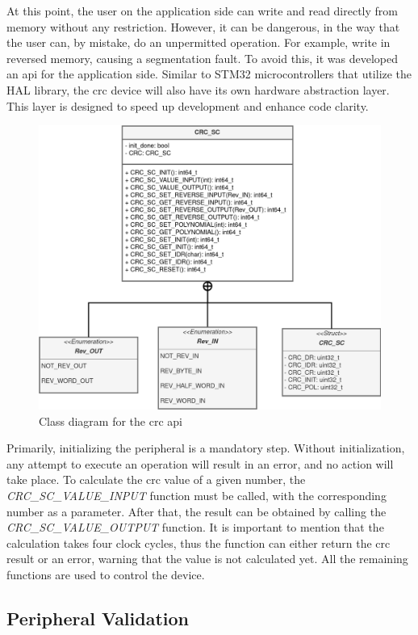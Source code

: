 At this point, the user on the application side can write and read directly from memory without any restriction. However, it can be
dangerous, in the way that the user can, by mistake, do an unpermitted operation. For example, write in reversed memory, causing a
segmentation fault. To avoid this, it was developed an \gls{api} for the application side. Similar to STM32 microcontrollers that 
utilize the HAL library, the \gls{crc} device will also have its own hardware abstraction layer. This layer is designed to speed up 
development and enhance code clarity.

\begin{figure}[H]
	\centering
 	\includegraphics[width=0.7\linewidth]{Images/CRC_API_Class_Diagram.png} 
 	\caption{Class diagram for the \gls{crc} \gls{api}}
\end{figure}

Primarily, initializing the peripheral is a mandatory step. Without initialization, any attempt to execute an operation will 
result in an error, and no action will take place. To calculate the \gls{crc} value of a given number, the \textit{CRC\_SC\_VALUE\_INPUT} 
function must be called, with the corresponding number as a parameter. After that, the result can be obtained by calling the 
\textit{CRC\_SC\_VALUE\_OUTPUT} function. It is important to mention that the calculation takes four clock cycles, thus the function can 
either return the \gls{crc} result or an error, warning that the value is not calculated yet. All the remaining functions are used to
control the device.

\subsection{Peripheral Validation}

